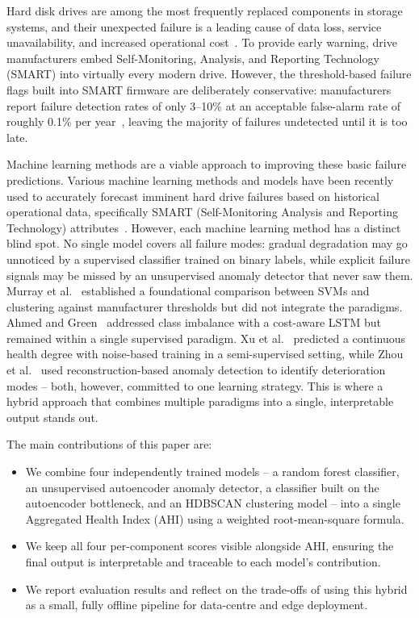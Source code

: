 \documentclass[sigconf,natbib=false]{acmart}
\begin{document}
Hard disk drives are among the most frequently replaced components in storage systems, and their unexpected failure is a leading cause of data loss, service unavailability, and increased operational cost~\cite{lu2020smarter}. To provide early warning, drive manufacturers embed Self-Monitoring, Analysis, and Reporting Technology (SMART) into virtually every modern drive. However, the threshold-based failure flags built into SMART firmware are deliberately conservative: manufacturers report failure detection rates of only 3--10\% at an acceptable false-alarm rate of roughly 0.1\% per year~\cite{murray2005}, leaving the majority of failures undetected until it is too late.

Machine learning methods are a viable approach to improving these basic failure predictions. Various machine learning methods and models have been recently used to accurately forecast imminent hard drive failures based on historical operational data, specifically SMART (Self-Monitoring Analysis and Reporting Technology) attributes~\cite{atekoja2024prediction}. However, each machine learning method has a distinct blind spot. No single model covers all failure modes: gradual degradation may go unnoticed by a supervised classifier trained on binary labels, while explicit failure signals may be missed by an unsupervised anomaly detector that never saw them. Murray et al.~\cite{murray2005} established a foundational comparison between SVMs and clustering against manufacturer thresholds but did not integrate the paradigms. Ahmed and Green~\cite{ahmed2024costaware} addressed class imbalance with a cost-aware LSTM but remained within a single supervised paradigm. Xu et al.~\cite{xu2018layerwise} predicted a continuous health degree with noise-based training in a semi-supervised setting, while Zhou et al.~\cite{zhou2024proactive} used reconstruction-based anomaly detection to identify deterioration modes -- both, however, committed to one learning strategy. This is where a hybrid approach that combines multiple paradigms into a single, interpretable output stands out.

The main contributions of this paper are:
\begin{itemize}
    \item We combine four independently trained models -- a random forest classifier, an unsupervised autoencoder anomaly detector, a classifier built on the autoencoder bottleneck, and an HDBSCAN clustering model -- into a single Aggregated Health Index (AHI) using a weighted root-mean-square formula.
    \item We keep all four per-component scores visible alongside AHI, ensuring the final output is interpretable and traceable to each model's contribution.
    \item We report evaluation results and reflect on the trade-offs of using this hybrid as a small, fully offline pipeline for data-centre and edge deployment.
\end{itemize}
\end{document}
